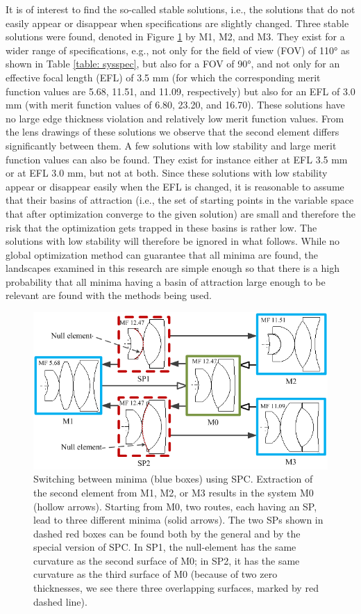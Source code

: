 It is of interest to find the so-called stable solutions, i.e., the solutions that do not easily appear or disappear when specifications are slightly changed. Three stable solutions were found, denoted in Figure \ref{fig:wideangleSwitch} by M1, M2, and M3. They exist for a wider range of specifications, e.g., not only for the field of view (FOV) of 110° as shown in Table \ref{table: sysspec}, but also for a FOV of 90°, and not only for an effective focal length (EFL) of 3.5 mm (for which the corresponding merit function values are 5.68, 11.51, and 11.09, respectively) but also for an EFL of 3.0 mm (with merit function values of 6.80, 23.20, and 16.70). These solutions have no large edge thickness violation and relatively low merit function values. From the lens drawings of these solutions we observe that the second element differs significantly between them. A few solutions with low stability and large merit function values can also be found. They exist for instance either at EFL 3.5 mm or at EFL 3.0 mm, but not at both. Since these solutions with low stability appear or disappear easily when the EFL is changed, it is reasonable to assume that their basins of attraction (i.e., the set of starting points in the variable space that after optimization converge to the given solution) are small and therefore the risk that the optimization gets trapped in these basins is rather low. The solutions with low stability will therefore be ignored in what follows. While no global optimization method can guarantee that all minima are found, the landscapes examined in this research are simple enough so that there is a high probability that all minima having a basin of attraction large enough to be relevant are found with the methods being used. 

\begin{figure}[h!]
    \centering
    \includegraphics[scale=0.6]{chapter-3/figures/WideAngleSwitch.png}
    \caption{Switching between minima (blue boxes) using SPC. Extraction of the second element from M1, M2, or M3 results in the system M0 (hollow arrows). Starting from M0, two routes, each having an SP, lead to three different minima (solid arrows). The two SPs shown in dashed red boxes can be found both by the general and by the special version of SPC. In SP1, the null-element has the same curvature as the second surface of M0; in SP2, it has the same curvature as the third surface of M0 (because of two zero thicknesses, we see there three overlapping surfaces, marked by red dashed line).}
    \label{fig:wideangleSwitch}
\end{figure}


